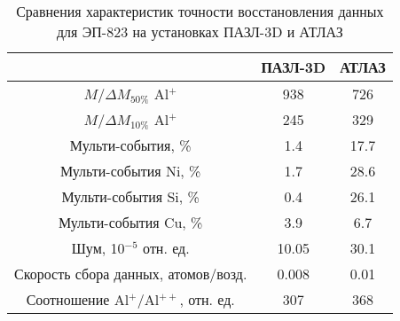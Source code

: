 \begin{table} [htbp]
	\centering
	\caption{Сравнения характеристик точности восстановления данных для ЭП-823 на установках ПАЗЛ-3D и АТЛАЗ}
	\label{tab:paramsAPPLEvsATLAS_EP3}
	\begin{SingleSpace}
		\begin{tabular} {| c | c | c |}
			\hline
			{}                                     & ПАЗЛ-3D & АТЛАЗ   \\ \hline
			$M/\Delta M_{50\%}$ Al$^+$             & 938     & 726     \\ \hline
			$M/\Delta M_{10\%}$ Al$^+$             & 245     & 329     \\ \hline
			Мульти-события, \%                     & 1.4     & 17.7                 \\ \hline
			Мульти-события Ni, \%                  & 1.7     & 28.6             \\ \hline
			Мульти-события Si, \%                  & 0.4     & 26.1             \\ \hline
			Мульти-события Cu, \%                  & 3.9     & 6.7             \\ \hline
			Шум, 10$^{-5}$ отн. ед.                & 10.05   & 30.1     \\ \hline
			Скорость сбора данных, атомов/возд.    & 0.008   & 0.01  \\ \hline
			Соотношение Al$^+$/Al$^{++}$, отн. ед. & 307     & 368     \\ \hline
		\end{tabular}
	\end{SingleSpace}
\end{table}

